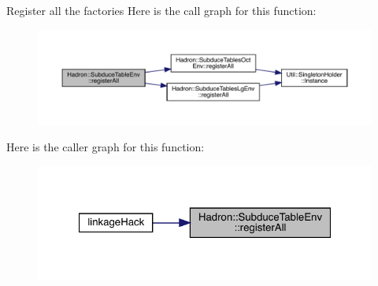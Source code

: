 Register all the factories Here is the call graph for this function\+:\nopagebreak
\begin{figure}[H]
\begin{center}
\leavevmode
\includegraphics[width=350pt]{dd/da5/namespaceHadron_1_1SubduceTableEnv_a168dd05273b8d8f0ca1cfb57fbe63e23_cgraph}
\end{center}
\end{figure}
Here is the caller graph for this function\+:
\nopagebreak
\begin{figure}[H]
\begin{center}
\leavevmode
\includegraphics[width=321pt]{dd/da5/namespaceHadron_1_1SubduceTableEnv_a168dd05273b8d8f0ca1cfb57fbe63e23_icgraph}
\end{center}
\end{figure}
